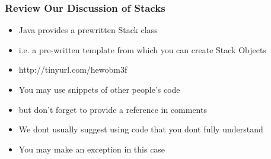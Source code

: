\documentclass{beamer}
\begin{document}
\begin{frame}
\frametitle{Review Our Discussion of Stacks}
\begin{itemize}
\item Java provides a prewritten Stack class
\item i.e. a pre-written template from which you can create Stack Objects
\item http://tinyurl.com/hewobm3f
\bigskip
\item You may use snippets of other people's code
\item but don't forget to provide a reference in comments
\bigskip
\item We dont usually suggest using code that you dont fully understand
\item You may make an exception in this case
\end{itemize}
\end{frame}
\end{document}
